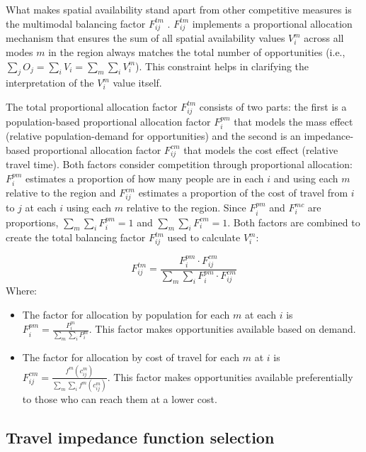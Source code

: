\documentclass[
  authoryear,
  preprint,
  3p]{elsarticle}
\providecommand{\tightlist}{%
  \setlength{\itemsep}{0pt}\setlength{\parskip}{0pt}}\usepackage{longtable,booktabs,array}
\def\tightlist{}
\begin{document}
What makes spatial availability stand apart from other competitive
measures is the multimodal balancing factor \(F^{tm}_{ij}\)
\citep{soukhovMultimodalSpatialAvailability2024, soukhovIntroducingSpatialAvailability2023}.
\(F^{tm}_{ij}\) implements a proportional allocation mechanism that
ensures the sum of all spatial availability values \(V^m_{i}\) across
all modes \(m\) in the region always matches the total number of
opportunities (i.e.,
\(\sum_j O_j = \sum_i V_i = \sum_{m} \sum_{i} V^m_{i}\)). This
constraint helps in clarifying the interpretation of the \(V^m_{i}\)
value itself.

The total proportional allocation factor \(F^{tm}_{ij}\) consists of two
parts: the first is a population-based proportional allocation factor
\(F_i^{pm}\) that models the mass effect (relative population-demand for
opportunities) and the second is an impedance-based proportional
allocation factor \(F_{ij}^{cm}\) that models the cost effect (relative
travel time). Both factors consider competition through proportional
allocation: \(F^{pm}_{i}\) estimates a proportion of how many people are
in each \(i\) and using each \(m\) relative to the region and
\(F^{cm}_{ij}\) estimates a proportion of the cost of travel from \(i\)
to \(j\) at each \(i\) using each \(m\) relative to the region. Since
\(F^{pm}_{i}\) and \(F^{mc}_{i}\) are proportions,
\(\sum_{m}\sum_{i}F^{pm}_{i} = 1\) and
\(\sum_{m} \sum_{i}F^{cm}_{i}=1\). Both factors are combined to create
the total balancing factor \(F^{tm}_{ij}\) used to calculate \(V^m_i\):

\[
F^{tm}_{ij} = \frac{F^{pm}_{i} \cdot F^{cm}_{ij}}{\sum_{m} \sum_{i} F^{pm}_{i} \cdot F^{cm}_{ij}}
\] \noindent Where:

\begin{itemize}
\tightlist
\item
  The factor for allocation by population for each \(m\) at each \(i\)
  is \(F^{pm}_{i} = \frac{P_{i}^m}{\sum_{m}\sum_{i} P_{i}^m}\). This
  factor makes opportunities available based on demand.
\item
  The factor for allocation by cost of travel for each \(m\) at \(i\) is
  \(F_{ij}^{cm} = \frac{f^m(c_{ij}^m)}{\sum_{m} \sum_{i} f^m(c_{ij}^m)}\).
  This factor makes opportunities available preferentially to those who
  can reach them at a lower cost.
\end{itemize}

\subsection{Travel impedance function
selection}\label{travel-impedance-function-selection}
\end{document}
